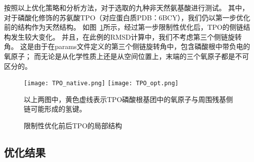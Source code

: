 按照以上优化策略和分析方法，对于选取的九种非天然氨基酸进行测试。
其中，对于磷酸化修饰的苏氨酸TPO（对应蛋白质PDB：6BCY），我们仍以第一步优化前的结构作为天然结构。
如图~\ref{fig:TPO}所示，经过第一步限制性优化后，TPO的侧链结构发生较大变化。
并且，在此例的RMSD计算中，我们不考虑第三个侧链旋转角。
这是由于在params文件定义的第三个侧链旋转角中，包含磷酸根中带负电的氧原子；
而无论是从化学性质上还是从空间位置上，末端的三个氧原子都是不可区分的。
\begin{figure}
  \centering
    {\texttt{[image: TPO\_native.png]}}
    {\texttt{[image: TPO\_opt.png]}}
  \caption{限制性优化前后TPO的局部结构}
  \label{fig:TPO}
  \begin{threeparttable}
    \begin{tablenotes}
      \item [①] 以上两图中，黄色虚线表示TPO磷酸根基团中的氧原子与周围残基侧链可能形成的氢键。
    \end{tablenotes}
  \end{threeparttable}
\end{figure}

\subsection{优化结果}

